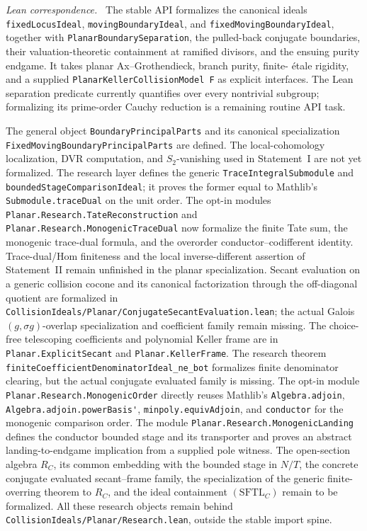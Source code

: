 \documentclass[11pt]{article}
\theoremstyle{remark}
\theoremstyle{definition}
\newcommand{\leanpath}[1]{\texttt{\nolinkurl{#1}}}
\newenvironment{leanfiles}
  {\par\medskip\begingroup\footnotesize\raggedright\noindent
   \textit{Lean correspondence.}\ }
  {\par\endgroup\medskip}
\begin{document}
\begin{leanfiles}
The stable API formalizes the canonical ideals
\leanpath{fixedLocusIdeal}, \leanpath{movingBoundaryIdeal}, and
\leanpath{fixedMovingBoundaryIdeal}, together with
\leanpath{PlanarBoundarySeparation}, the pulled-back conjugate boundaries,
their valuation-theoretic containment at ramified divisors, and the ensuing
purity endgame.  It takes planar Ax--Grothendieck, branch purity, finite-
\'etale rigidity, and a supplied \leanpath{PlanarKellerCollisionModel F} as
explicit interfaces.  The Lean separation predicate currently quantifies
over every nontrivial subgroup; formalizing its prime-order Cauchy reduction
is a remaining routine API task.

The general object \leanpath{BoundaryPrincipalParts} and its canonical
specialization \leanpath{FixedMovingBoundaryPrincipalParts} are defined.
The local-cohomology localization, DVR computation, and \(S_2\)-vanishing
used in Statement~I are not yet formalized.  The research layer defines the
generic \leanpath{TraceIntegralSubmodule} and
\leanpath{boundedStageComparisonIdeal}; it proves the former equal to
Mathlib's \leanpath{Submodule.traceDual} on the unit order.  The opt-in
modules \leanpath{Planar.Research.TateReconstruction} and
\leanpath{Planar.Research.MonogenicTraceDual} now formalize the finite Tate
sum, the monogenic trace-dual formula, and the overorder
conductor--codifferent identity.  Trace-dual/Hom finiteness and the local
inverse-different assertion of Statement~II remain unfinished in the planar
specialization.  Secant evaluation on a generic collision cocone and its
canonical factorization through the off-diagonal quotient are formalized in
\leanpath{CollisionIdeals/Planar/ConjugateSecantEvaluation.lean}; the actual
Galois \((g,\sigma g)\)-overlap specialization and coefficient family remain
missing.  The
choice-free telescoping coefficients and polynomial Keller frame are in
\leanpath{Planar.ExplicitSecant} and \leanpath{Planar.KellerFrame}.  The
research theorem \leanpath{finiteCoefficientDenominatorIdeal_ne_bot}
formalizes finite denominator clearing, but the actual conjugate evaluated
family is missing.  The opt-in module
\leanpath{Planar.Research.MonogenicOrder} directly reuses Mathlib's
\leanpath{Algebra.adjoin}, \leanpath{Algebra.adjoin.powerBasis'},
\leanpath{minpoly.equivAdjoin}, and \leanpath{conductor} for the monogenic
comparison order.  The module \leanpath{Planar.Research.MonogenicLanding}
defines the conductor bounded stage and its transporter and proves an
abstract landing-to-endgame implication from a supplied pole witness.  The
open-section algebra \(R_C\), its common embedding with the bounded stage in
\(N/T\), the concrete conjugate evaluated secant--frame family, the
specialization of the generic finite-overring theorem to \(R_C\), and the
ideal containment
\((\mathrm{SFTL}_C)\) remain to be formalized.  All these research objects
remain behind \leanpath{CollisionIdeals/Planar/Research.lean}, outside the
stable import spine.
\end{leanfiles}
\end{document}

